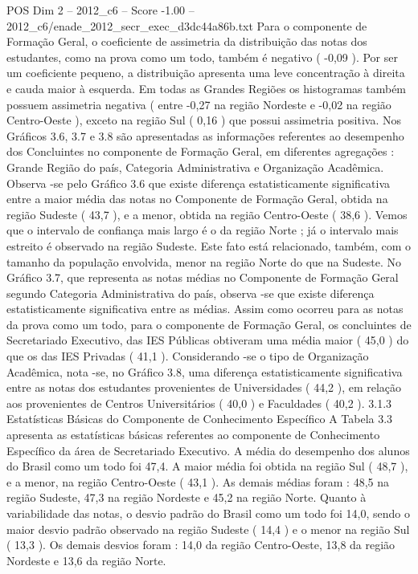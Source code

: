 \begin{textsample}{POS Dim 2 – 2012\_c6 – Score -1.00 – 2012\_c6/enade\_2012\_secr\_exec\_d3dc44a86b.txt}
Para o componente de Formação Geral, o coeficiente de assimetria da distribuição das notas dos estudantes, como na prova como um todo, também é negativo ( -0,09 ).
Por ser um coeficiente pequeno, a distribuição apresenta uma leve concentração à direita e cauda maior à esquerda.
Em todas as Grandes Regiões os histogramas também possuem assimetria negativa ( entre -0,27 na região Nordeste e -0,02 na região Centro-Oeste ), exceto na região Sul ( 0,16 ) que possui assimetria positiva.
Nos Gráficos 3.6, 3.7 e 3.8 são apresentadas as informações referentes ao desempenho dos Concluintes no componente de Formação Geral, em diferentes agregações : Grande Região do país, Categoria Administrativa e Organização Acadêmica.
Observa -se pelo Gráfico 3.6 que existe diferença estatisticamente significativa entre a maior média das notas no Componente de Formação Geral, obtida na região Sudeste ( 43,7 ), e a menor, obtida na região Centro-Oeste ( 38,6 ).
Vemos que o intervalo de confiança mais largo é o da região Norte ; já o intervalo mais estreito é observado na região Sudeste.
Este fato está relacionado, também, com o tamanho da população envolvida, menor na região Norte do que na Sudeste.
No Gráfico 3.7, que representa as notas médias no Componente de Formação Geral segundo Categoria Administrativa do país, observa -se que existe diferença estatisticamente significativa entre as médias.
Assim como ocorreu para as notas da prova como um todo, para o componente de Formação Geral, os concluintes de Secretariado Executivo, das IES Públicas obtiveram uma média maior ( 45,0 ) do que os das IES Privadas ( 41,1 ).
Considerando -se o tipo de Organização Acadêmica, nota -se, no Gráfico 3.8, uma diferença estatisticamente significativa entre as notas dos estudantes provenientes de Universidades ( 44,2 ), em relação aos provenientes de Centros Universitários ( 40,0 ) e Faculdades ( 40,2 ). 3.1.3 Estatísticas Básicas do Componente de Conhecimento Específico A Tabela 3.3 apresenta as estatísticas básicas referentes ao componente de Conhecimento Específico da área de Secretariado Executivo.
A média do desempenho dos alunos do Brasil como um todo foi 47,4.
A maior média foi obtida na região Sul ( 48,7 ), e a menor, na região Centro-Oeste ( 43,1 ).
As demais médias foram : 48,5 na região Sudeste, 47,3 na região Nordeste e 45,2 na região Norte.
Quanto à variabilidade das notas, o desvio padrão do Brasil como um todo foi 14,0, sendo o maior desvio padrão observado na região Sudeste ( 14,4 ) e o menor na região Sul ( 13,3 ).
Os demais desvios foram : 14,0 da região Centro-Oeste, 13,8 da região Nordeste e 13,6 da região Norte.

\end{textsample}
